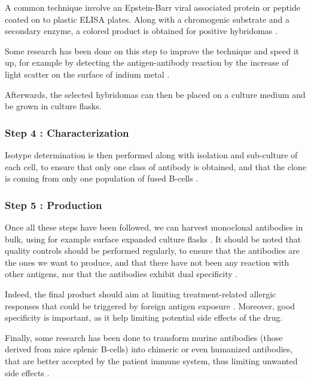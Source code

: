 A common technique involve an Epstein-Barr viral associated protein or peptide
coated on to plastic ELISA plates. Along with a chromogenic substrate and a
secondary enzyme, a colored product is obtained
for positive hybridomas \cite{grunow_cell_1994} \cite{nelson_monoclonal_2000}.

Some research has been done on this step to improve the technique and
speed it up, for example by detecting the antigen-antibody reaction by the 
increase of light scatter on the surface of indium metal \cite{rej_screening_1988}.

Afterwards, the selected hybridomas can then be placed on a culture medium
and be grown in culture flasks.

\subsubsection{Step 4 : Characterization}

Isotype determination is then performed along with isolation and sub-culture
of each cell, to ensure that only one class of antibody is obtained,
and that the clone is coming from only one population 
of fused B-cells \cite{nelson_monoclonal_2000}.

\subsubsection{Step 5 : Production}

Once all these steps have been followed, we can harvest monoclonal
antibodies in bulk, using for example surface expanded culture flasks
\cite{nelson_monoclonal_2000}. It should be noted that quality controls
should be performed regularly, to ensure that the antibodies are the ones
we want to produce, and that there have not been any reaction with other
antigens, nor that the antibodies exhibit dual 
specificity \cite{nelson_monoclonal_2000}.

Indeed, the final product should aim at limiting treatment-related
allergic responses that could be triggered by foreign antigen exposure
\cite{methods_of_producing_mAbs_large_scale_1999}.
Moreover, good specificity is important, as it help limiting potential 
side effects of the drug.

Finally, some research has been done to transform murine antibodies
(those derived from mice splenic B-cells) into chimeric or even humanized antibodies,
that are better accepted by the patient immune system, thus limiting
unwanted side effects \cite{noauthor_how_2020} \cite{ahmadzadeh_antibody_2014}.
